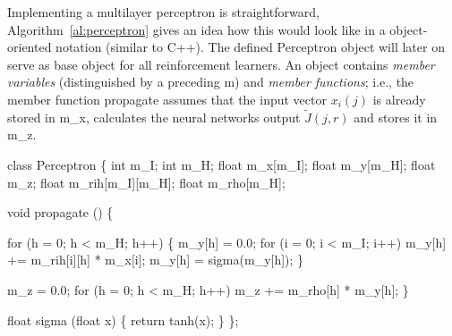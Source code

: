 Implementing a multilayer perceptron is straightforward, Algorithm~\ref{al:perceptron} gives an idea how this would look like in a object-oriented notation (similar to C++). The defined {\al Perceptron} object will later on serve as base object for all reinforcement learners. An object contains \emph{member variables} (distinguished by a preceding {\al m}) and \emph{member functions}; i.e., the member function {\al propagate} assumes that the input vector $x_i(j)$ is already stored in {\al m\_x}, calculates the neural networks output $\tilde J(j,r)$ and stores it in {\al m\_z}.


\begin{algorithm} \label{al:perceptron}
class Perceptron
\{
  int m_I; 
  int m_H; 
  float m_x[m_I]; 
  float m_y[m_H]; 
  float m_z; 
  float m_rih[m_I][m_H]; 
  float m_rho[m_H]; 
  
  void propagate ()
  \{

    for (h = 0; h < m_H; h++)  
    \{   
      m_y[h] = 0.0; 
      for (i = 0; i < m_I; i++) m_y[h] += m_rih[i][h] * m_x[i];
      m_y[h] = sigma(m_y[h]); 
    \}

    m_z = 0.0; 
    for (h = 0; h < m_H; h++) m_z += m_rho[h] * m_y[h];
  \}

  float sigma (float x)
  \{
    return tanh(x); 
  \}
\};
\end{algorithm}






